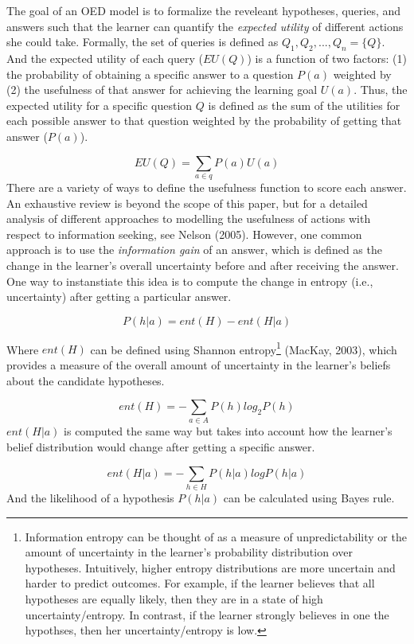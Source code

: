 \documentclass[english,floatsintext,man]{apa6}
\theoremstyle{definition}
\theoremstyle{definition}
\theoremstyle{definition}
\theoremstyle{remark}
\begin{document}
The goal of an OED model is to formalize the reveleant hypotheses,
queries, and answers such that the learner can quantify the
\emph{expected utility} of different actions she could take. Formally,
the set of queries is defined as \(Q_1, Q_2,..., Q_n = \{Q\}\). And the
expected utility of each query (\(EU(Q)\)) is a function of two factors:
(1) the probability of obtaining a specific answer to a question
\(P(a)\) weighted by (2) the usefulness of that answer for achieving the
learning goal \(U(a)\). Thus, the expected utility for a specific
question \(Q\) is defined as the sum of the utilities for each possible
answer to that question weighted by the probability of getting that
answer (\(P(a)\)).

\[EU(Q) = \sum_{a\in q}{P(a)U(a)}\] \noindent
There are a variety of ways to define the usefulness function to score
each answer. An exhaustive review is beyond the scope of this paper, but
for a detailed analysis of different approaches to modelling the
usefulness of actions with respect to information seeking, see Nelson
(2005). However, one common approach is to use the \emph{information
gain} of an answer, which is defined as the change in the learner's
overall uncertainty before and after receiving the answer. One way to
instanstiate this idea is to compute the change in entropy (i.e.,
uncertainty) after getting a particular answer.

\[P(h|a) = ent(H) - ent(H|a)\]

\noindent
Where \(ent(H)\) can be defined using Shannon entropy\footnote{Information
  entropy can be thought of as a measure of unpredictability or the
  amount of uncertainty in the learner's probability distribution over
  hypotheses. Intuitively, higher entropy distributions are more
  uncertain and harder to predict outcomes. For example, if the learner
  believes that all hypotheses are equally likely, then they are in a
  state of high uncertainty/entropy. In contrast, if the learner
  strongly believes in one the hypothses, then her uncertainty/entropy
  is low.} (MacKay, 2003), which provides a measure of the overall
amount of uncertainty in the learner's beliefs about the candidate
hypotheses.

\[ent(H) = -\sum_{a\in A}{P(h)log_2P(h)}\] \noindent
\(ent(H|a)\) is computed the same way but takes into account how the
learner's belief distribution would change after getting a specific
answer.

\[ ent(H|a) = -\sum_{h\in H}{P(h|a)logP(h|a)} \] \noindent
And the likelihood of a hypothesis \(P(h|a)\) can be calculated using
Bayes rule.
\end{document}
